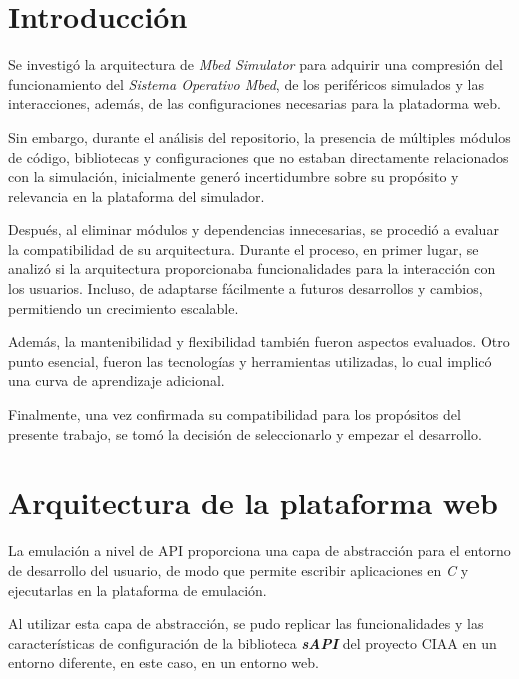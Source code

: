 \section{Introducción}
 
Se investigó la arquitectura de \textit{Mbed Simulator} para adquirir una compresión del funcionamiento del \textit{Sistema Operativo Mbed}, de los periféricos simulados y las interacciones, además, de las configuraciones necesarias para la platadorma web.

Sin embargo, durante el análisis del repositorio, la presencia de múltiples módulos de código, bibliotecas y configuraciones que no estaban directamente relacionados con la simulación, inicialmente generó incertidumbre sobre su propósito y relevancia en la plataforma del simulador.
 
Después, al eliminar módulos y dependencias innecesarias, se procedió a evaluar la compatibilidad de su arquitectura. Durante el proceso, en primer lugar, se analizó si la arquitectura proporcionaba funcionalidades para la interacción con los usuarios. Incluso, de adaptarse fácilmente a futuros desarrollos y cambios, permitiendo un crecimiento escalable.

Además, la mantenibilidad y flexibilidad también fueron aspectos evaluados. Otro punto esencial, fueron las tecnologías y herramientas utilizadas, lo cual implicó una curva de aprendizaje adicional. 

Finalmente, una vez confirmada su compatibilidad para los propósitos del presente trabajo, se tomó la decisión de seleccionarlo y empezar el desarrollo.


\section{Arquitectura de la plataforma web}

La emulación a nivel de API proporciona una capa de abstracción para el entorno de desarrollo del usuario, de modo que permite escribir aplicaciones en \textit{C} y ejecutarlas en la plataforma de emulación. 

Al utilizar esta capa de abstracción, se pudo replicar las funcionalidades y las características de configuración de la biblioteca \textit{\textbf{sAPI}} del proyecto CIAA en un entorno diferente, en este caso, en un entorno web.


